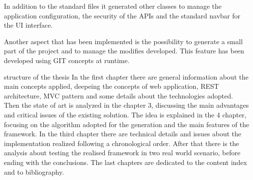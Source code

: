 In addition to the standard files it generated other classes to manage the application configuration, the security of the APIs and the standard navbar for the UI interface.

Another aspect that has been implemented is the possibility to generate a small part of the project and to manage the modifies developed. This feature has been developed using GIT concepts at runtime.




structure of the thesis 
In the first chapter there are general information about the main concepts applied, deepeing the concepts of web application, REST architecture, MVC pattern and some details about the technologies adopted.
Then the state of art is analyzed in the chapter 3, discussing the main advantages and critical issues of the existing solution.
The idea is explained in the 4 chapter, focusing on the algorithm adopted for the generation and the main features of the framework.
In the third chapter there are technical details and issues about the implementation realized following a chronological order.
After that there is the analysis about testing the realised framework in two real world scenario, before ending with the conclusions.
The last chapters are dedicated to the content index and to bibliography.

